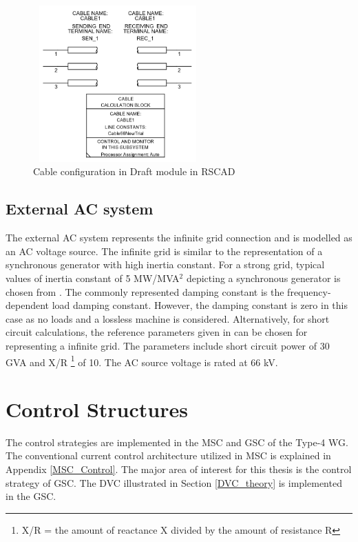 \begin{figure}[H]
  \centering
  \includegraphics[height = 6cm,width = 6.5cm]{Diagrams/Chapter_3/CableParaBlock.PNG}  
  \caption{Cable configuration in Draft module in RSCAD}
  \label{fig:CableParaBlock}
\end{figure}

\subsection{External AC system}\label{ext_AC_source}
The external \gls{AC} system represents the infinite grid connection and is modelled as an \gls{AC} voltage source. The infinite grid is similar to the representation of a synchronous generator with high inertia constant. For a strong grid, typical values of inertia constant of 5 MW/MVA$^2$ depicting a synchronous generator is chosen from \cite{kothari2003modern}. The commonly represented damping constant is the frequency-dependent load damping constant. However, the damping constant is zero in this case as no loads and a lossless machine is considered. Alternatively, for short circuit calculations, the reference parameters given in \cite{wachal2014guide} can be chosen for representing a infinite grid. The parameters include short circuit power of 30 GVA and X/R \footnote{X/R = the amount of reactance X divided by the amount of resistance R} of 10. The \gls{AC} source voltage is rated at 66 kV.

\section{Control Structures}
The control strategies are implemented in the \gls{MSC} and \gls{GSC} of the Type-4 \gls{WG}. The conventional current control architecture utilized in \gls{MSC} is explained in Appendix \ref{MSC_Control}. The major area of interest for this thesis is the control strategy of \gls{GSC}. The \gls{DVC} illustrated in Section \ref{DVC_theory} is implemented in the \gls{GSC}.   

